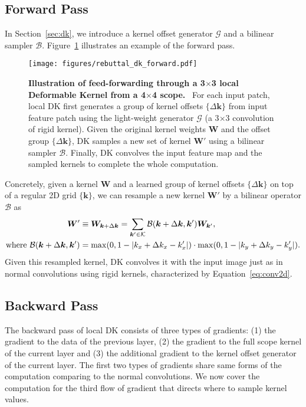 \documentclass{article} \usepackage{iclr2020_conference, times}
\def\vk{{\bm{k}}}
\def\mW{{\bm{W}}}
\def\gB{{\mathcal{B}}}
\def\gG{{\mathcal{G}}}
\def\gK{{\mathcal{K}}}
\newcommand{\captiont}[2]{\caption{\textbf{#1} #2}}
\begin{document}
\subsection{Forward Pass}
In Section~\ref{sec:dk}, we introduce a kernel offset
generator $\gG$ and a bilinear sampler $\gB$.
Figure~\ref{fig:local-dk} illustrates an example of the forward pass.
\begin{figure}[t]
    \centering
    \texttt{[image: figures/rebuttal\_dk\_forward.pdf]}
    \captiont{
            Illustration of feed-forwarding through a 3$\times$3 local
            Deformable Kernel from a 4$\times$4 scope.
        }{\
        For each input patch, local DK first generates a group of kernel
        offsets $\{\Delta \vk\}$ from input feature patch using the light-weight
        generator $\gG$ (a 3$\times$3 convolution of rigid kernel).
        Given the original kernel weights $\mW$ and the offset group $\{\Delta \vk\}$, DK
        samples a new set of kernel $\mW'$ using a bilinear sampler $\gB$.
        Finally, DK convolves the input feature map and the sampled kernels to complete the
        whole computation.
    }\vspace{-0.5em}
    \label{fig:local-dk}
\end{figure}

Concretely, given a kernel $\mW$ and a learned group of kernel offsets $\{\Delta \vk\}$ on
top of a regular 2D grid $\{\vk\}$, we can resample a new kernel $\mW'$ by
a bilinear operator $\gB$ as
\begin{align}
\small
    \mW'
    &\equiv
    \mW_{\vk + \Delta \vk}
    =
    \sum_{\vk' \in \gK}
    \gB(\vk + \Delta \vk, \vk')
    \mW_{\vk'}
    ,\\
    \text{where  }
    \gB(\vk + \Delta \vk, \vk')
    &=
    \max(0, 1 - |k_x + \Delta k_x -k'_x|)
    \cdot
    \max(0, 1 - |k_y + \Delta k_y-k'_y|). \nonumber
\end{align}
Given this resampled kernel, DK convolves it with the input image just as in normal
convolutions using rigid kernels, characterized by Equation~\ref{eq:conv2d}.

\subsection{Backward Pass}
The backward pass of local DK consists of three types of gradients: (1)
the gradient to the data of the previous layer, (2) the gradient to the full scope
kernel of the current layer and (3) the additional gradient to the kernel
offset generator of the current layer.
The first two types of gradients share same forms of the computation comparing
to the normal convolutions.
We now cover the computation for the third flow of gradient that directs where
to sample kernel values.
\end{document}
